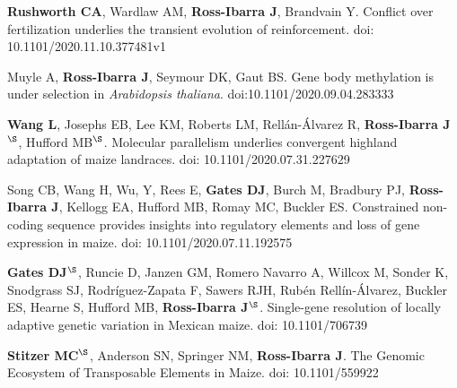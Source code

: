 \documentclass[letterpaper,10pt]{article}
\renewenvironment{itemize}{
  \begin{list}{}{
    \setlength{\leftmargin}{1.5em}
  }
}{
  \end{list}
}
\begin{document}
\begin{itemize}
\item \textbf{Rushworth CA},  Wardlaw AM, \textbf{Ross-Ibarra J}, Brandvain Y. Conflict over fertilization underlies the transient evolution of reinforcement. doi: 10.1101/2020.11.10.377481v1

\item Muyle A, \textbf{Ross-Ibarra J}, Seymour DK, Gaut BS. Gene body methylation is under selection in \textit{Arabidopsis thaliana}. doi:10.1101/2020.09.04.283333

\item \textbf{Wang L}, Josephs EB, Lee KM, Roberts LM, Rell\'{a}n-\'{A}lvarez R, \textbf{Ross-Ibarra J}$^\S$, Hufford MB$^\S$. Molecular parallelism underlies convergent highland adaptation of maize landraces. doi: 10.1101/2020.07.31.227629

\item Song CB, Wang H, Wu, Y, Rees E, \textbf{Gates DJ}, Burch M,  Bradbury PJ, \textbf{Ross-Ibarra J}, Kellogg EA, Hufford MB, Romay MC, Buckler ES.  Constrained non-coding sequence provides insights into regulatory elements and loss of gene expression in maize. doi: 10.1101/2020.07.11.192575

\item \textbf{Gates DJ}$^\S$, Runcie D, Janzen GM, Romero Navarro A,  Willcox M,  Sonder K, Snodgrass SJ, Rodr\'{i}guez-Zapata F,  Sawers RJH, Rub\'{e}n Rell\'{i}n-\'{A}lvarez, Buckler ES, Hearne S, Hufford MB, \textbf{Ross-Ibarra J}$^\S$. Single-gene resolution of locally adaptive genetic variation in Mexican maize. doi: 10.1101/706739

\item \textbf{Stitzer MC}$^\S$, Anderson SN, Springer NM, \textbf{Ross-Ibarra J}. The Genomic Ecosystem of Transposable Elements in Maize. doi: 10.1101/559922

\end{itemize}

\end{document}
